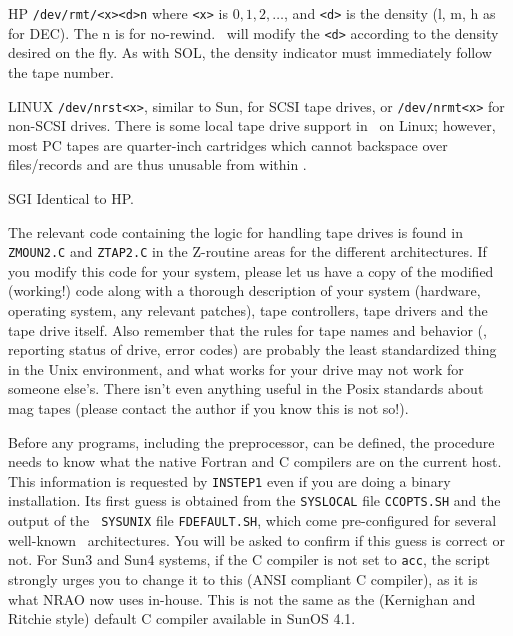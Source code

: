 {\item{HP}   {\tt /dev/rmt/<x><d>n} where {\tt <x>} is $0, 1, 2, \dots$,
            and {\tt <d>} is the density (l, m, h as for DEC).  The n is
            for no-rewind.  \AIPS\ will modify the {\tt <d>} according to
            the density desired on the fly.  As with SOL, the density
            indicator must immediately follow the tape number.
\item{LINUX} {\tt /dev/nrst<x>}, similar to Sun, for SCSI tape drives, or
            {\tt /dev/nrmt<x>} for non-SCSI drives.  There is some local
            tape drive support in {\tt\thisver}\ on Linux; %
            however, most PC tapes are quarter-inch cartridges which
            cannot backspace over files/records and are thus unusable from
            within \AIPS.
\item{SGI} Identical to HP.
}
\medskip

\noindent The relevant code containing the logic for handling tape drives
is found in {\tt ZMOUN2.C} and {\tt ZTAP2.C} in the Z-routine areas for
the different architectures.  If you modify this code for your system,
please let us have a copy of the modified (working!) code along with a
thorough description of your system (hardware, operating system, any
relevant patches), tape controllers, tape drivers and the tape drive
itself.  Also remember that the rules for tape names and behavior (\eg,
reporting status of drive, error codes) are probably the least
standardized thing in the Unix environment, and what works for your drive
may not work for someone else's.  There isn't even anything useful in the
Posix standards about mag tapes (please contact the author if you know this
is not so!).

\medskip{}

Before any programs, including the preprocessor, can be defined, the
procedure needs to know what the native Fortran and C compilers are on the
current host.  This information is requested by {\tt INSTEP1} even if you
are doing a binary installation.  Its first guess is obtained from the
{\tt \dol SYSLOCAL} file {\tt CCOPTS.SH} and the output of the {\tt\dol
SYSUNIX} file {\tt FDEFAULT.SH}, which come pre-configured for several
well-known \AIPS\ architectures.  You will be asked to confirm if this
guess is correct or not.  For Sun3 and Sun4 systems, if the C compiler is
not set to {\tt acc}, the script strongly urges you to change it to this
(ANSI compliant C compiler), as it is what NRAO now uses in-house.  This
is not the same as the (Kernighan and Ritchie style) default C compiler
available in SunOS 4.1.

